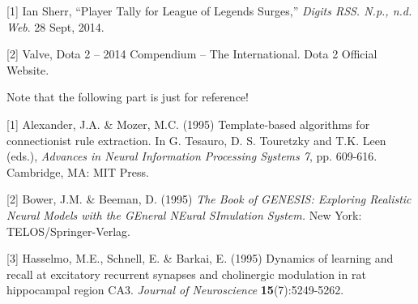 \documentclass{article} %
\begin{document}
\small{

[1] Ian Sherr, ``Player Tally for League of Legends Surges,'' \textit{Digits RSS. N.p., n.d. Web}. 28 Sept, 2014.

[2] Valve, Dota 2 -- 2014 Compendium -- The International. Dota 2 Official Website.

Note that the following part is just for reference!

[1] Alexander, J.A. \& Mozer, M.C. (1995) Template-based algorithms
for connectionist rule extraction. In G. Tesauro, D. S. Touretzky
and T.K. Leen (eds.), {\it Advances in Neural Information Processing
Systems 7}, pp. 609-616. Cambridge, MA: MIT Press.

[2] Bower, J.M. \& Beeman, D. (1995) {\it The Book of GENESIS: Exploring
Realistic Neural Models with the GEneral NEural SImulation System.}
New York: TELOS/Springer-Verlag.

[3] Hasselmo, M.E., Schnell, E. \& Barkai, E. (1995) Dynamics of learning
and recall at excitatory recurrent synapses and cholinergic modulation
in rat hippocampal region CA3. {\it Journal of Neuroscience}
{\bf 15}(7):5249-5262.
}
\end{document}
